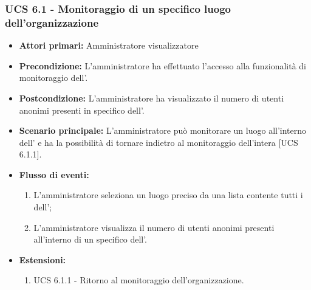 \subsubsection{UCS 6.1 - Monitoraggio di un specifico luogo dell'organizzazione}
\begin{itemize}
	\item \textbf{Attori primari:} Amministratore visualizzatore
	\item \textbf{Precondizione:} L'amministratore ha effettuato l'accesso alla funzionalità di monitoraggio dell'.
	\item \textbf{Postcondizione:} L'amministratore ha visualizzato il numero di utenti anonimi presenti in specifico  dell'.
	\item \textbf{Scenario principale:} L'amministratore può monitorare un luogo all'interno dell' e ha la possibilità di tornare indietro al monitoraggio dell'intera  [UCS 6.1.1].
	\item \textbf{Flusso di eventi:}
	\begin{enumerate}
	\item L'amministratore seleziona un luogo preciso da una lista contente tutti i  dell';
	\item L'amministratore visualizza il numero di utenti anonimi presenti all'interno di un specifico  dell'.
	\end{enumerate}
	\item \textbf{Estensioni:}
    \begin{enumerate}
        \item UCS 6.1.1 - Ritorno al monitoraggio dell'organizzazione.
    \end{enumerate}
\end{itemize}

